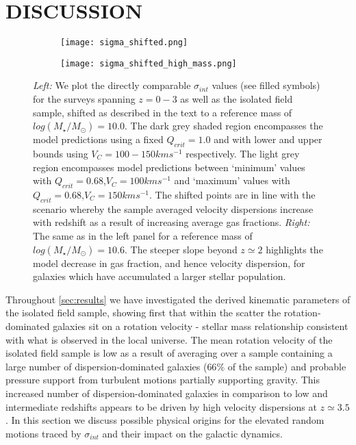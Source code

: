 \documentclass[fleqn,usenatbib]{mn2e}
\begin{document}
\section{DISCUSSION}\label{sec:discussion}


\begin{figure*}
    \centering \hspace{-1.3cm}
    \begin{subfigure}[h!]{0.5\textwidth}
        \centering
        \texttt{[image: sigma\_shifted.png]}
    \end{subfigure} \hspace{+0.4cm}
    \begin{subfigure}[h!]{0.5\textwidth}
        \centering
        \texttt{[image: sigma\_shifted\_high\_mass.png]}
    \end{subfigure}
    \caption{{\it Left:} We plot the directly comparable $\sigma_{int}$ values (see filled symbols) for the surveys spanning $z=0-3$ as well as the isolated field sample, shifted as described in the text to a reference mass of $log(M_{\star}/M_{\odot}) = 10.0$.
    The dark grey shaded region encompasses the model predictions using a fixed $Q_{crit} = 1.0$ and with lower and upper bounds using $V_{C} = 100-150kms^{-1}$ respectively.
    The light grey region encompasses model predictions between `minimum' values with $Q_{crit} = 0.68$,$V_{C}=100kms^{-1}$ and `maximum' values with $Q_{crit} = 0.68$,$V_{C}=150kms^{-1}$.
    The shifted points are in line with the scenario whereby the sample averaged velocity dispersions increase with redshift as a result of increasing average gas fractions. 
    {\it Right:} The same as in the left panel for a reference mass of $log(M_{\star}/M_{\odot}) = 10.6$.
    The steeper slope beyond $z\simeq2$ highlights the model decrease in gas fraction, and hence velocity dispersion, for galaxies which have accumulated a larger stellar population.}
    \label{fig:sigma_shifted}
\end{figure*}

Throughout \cref{sec:results} we have investigated the derived kinematic parameters of the isolated field sample, showing first that within the scatter the rotation-dominated galaxies sit on a rotation velocity - stellar mass relationship consistent with what is observed in the local universe.
The mean rotation velocity of the isolated field sample is low as a result of averaging over a sample containing a large number of dispersion-dominated galaxies ($66\%$ of the sample) and probable pressure support from turbulent motions \citep[e.g.][]{Burkert2010} partially supporting gravity.
This increased number of dispersion-dominated galaxies in comparison to low and intermediate redshifts appears to be driven by high velocity dispersions at $z\simeq3.5$.
In this section we discuss possible physical origins for the elevated random motions traced by $\sigma_{int}$ and their impact on the galactic dynamics.
\end{document}
